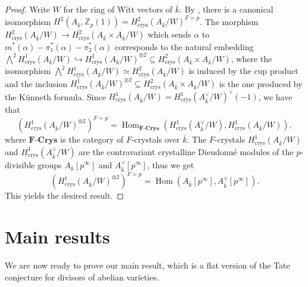 \documentclass[11pt]{amsart}
\newcommand{\kbar}{{\bar{k}}}
\newcommand{\Zp}{{\mathbb{Z}_{p}}}
\DeclareMathOperator{\Hom}{Hom}
\newcommand{\crys}{{\mathrm{crys}}}
\begin{document}
\begin{proof}	Write $W$ for the ring of Witt vectors of $\kbar$. By \cite[Rmq. II.5.10]{Ill79}, there is a canonical isomorphism $H^2(A_\kbar,\Zp(1))=H^2_{\crys}(A_\kbar/W)^{F=p}$. The morphism $H^2_{\crys}(A_\kbar/W)\to H^2_{\crys}(A_\kbar\times A_\kbar/W)$ which sends $\alpha$ to $m^*(\alpha)-\pi_1^*(\alpha)-\pi_2^*(\alpha)$ corresponds to the natural embedding $\bigwedge^2 H^1_{\crys}(A_\kbar/W)\hookrightarrow H^1_{\crys}(A_\kbar/W)^{\otimes 2}\subseteq H^2_{\crys}(A_\kbar\times A_\kbar/W)$, where the isomorphism $\bigwedge^2 H^1_{\crys}(A_\kbar/W)\simeq H^2_{\crys}(A_\kbar/W)$ is induced by the cup product and the inclusion $H^1_{\crys}(A_\kbar/W)^{\otimes 2}\subseteq H^2_{\crys}(A_\kbar\times A_\kbar/W)$ is the one produced by the K\"unneth formula. Since $H^1_{\crys}(A_\kbar/W)=H^1_{\crys}(A_\kbar^\vee/W)^\vee(-1)$, we have that $$(H^1_{\crys}(A_\kbar/W)^{\otimes 2})^{F=p}=\Hom_{\mathbf{F\textbf{-}Crys}}(H^1_{\crys}(A_\kbar^\vee/W),H^1_{\crys}(A_\kbar/W)),$$ where $\mathbf{F\textbf{-}Crys}$ is the category of $F$-crystals over $\kbar$. The $F$-crystals $H^1_{\crys}(A_\kbar/W)$ and $H^1_{\crys}(A_\kbar^\vee/W)$ are the contravariant crystalline Dieudonné modules of the $p$-divisible groups $A_\kbar[p^\infty]$ and $A^\vee_\kbar[p^\infty]$, thus we get $$(H^1_{\crys}(A_\kbar/W)^{\otimes 2})^{F=p}=\Hom(A_\kbar[p^\infty],A^\vee_\kbar[p^\infty]).$$
This yields the desired result.
\end{proof}
\section{Main results}\label{main-resu:s}

We are now ready to prove our main result, which is a flat version of the Tate conjecture for divisors of abelian varieties.
\end{document}
